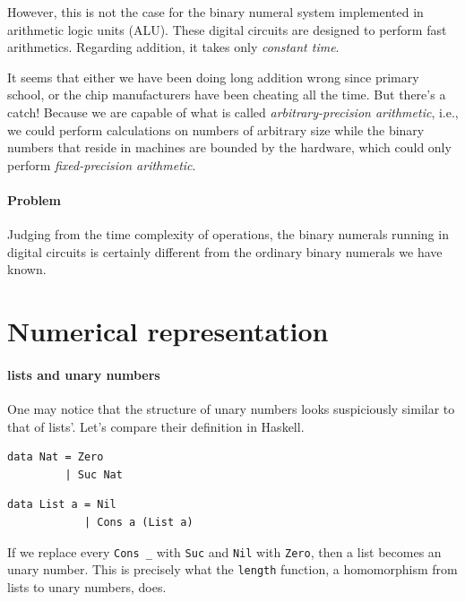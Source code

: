 \documentclass[\main/thesis.tex]{subfiles}
\begin{document}
However, this is not the case for the binary numeral system implemented in
arithmetic logic units (ALU). These digital circuits are designed to perform
fast arithmetics. Regarding addition, it takes only \textit{constant time}.

It seems that either we have been doing long addition wrong since primary school,
or the chip manufacturers have been cheating all the time. But there's a catch!
Because we are capable of what is called \textit{arbitrary-precision arithmetic},
i.e., we could perform calculations on numbers of arbitrary size
while the binary numbers that reside in machines are bounded by the hardware,
which could only perform \textit{fixed-precision arithmetic}.

\paragraph{Problem}
Judging from the time complexity of operations, the binary numerals running in
digital circuits is certainly different from the ordinary binary numerals we have
known.

\section{Numerical representation}

\paragraph{lists and unary numbers}

One may notice that the structure of unary numbers looks suspiciously similar
to that of lists'. Let's compare their definition in Haskell.

\noindent\begin{minipage}{.45\textwidth}
\begin{lstlisting}
data Nat = Zero
         | Suc Nat
\end{lstlisting}
\end{minipage}\hfill
\begin{minipage}{.48\textwidth}
\begin{lstlisting}
data List a = Nil
            | Cons a (List a)
\end{lstlisting}
\end{minipage}

If we replace every {\lstinline|Cons _|} with {\lstinline|Suc|} and
{\lstinline|Nil|} with {\lstinline|Zero|}, then a list becomes an unary number.
This is precisely what the {\lstinline|length|} function,
a homomorphism from lists to unary numbers, does.
\end{document}
